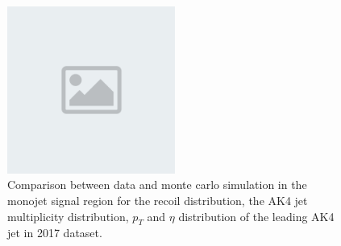 \begin{figure}[htbp]
\begin{center}
        \includegraphics[width=0.49\textwidth]{placeholder.png}
    \end{center}
    \caption{Comparison between data and monte carlo simulation in the monojet signal region for
        the recoil distribution, the AK4 jet multiplicity distribution,  $p_T$ and $\eta$
        distribution of the leading AK4  jet in 2017 dataset.}
    \label{fig:SR_pre_monojet_2017}
\end{figure}

